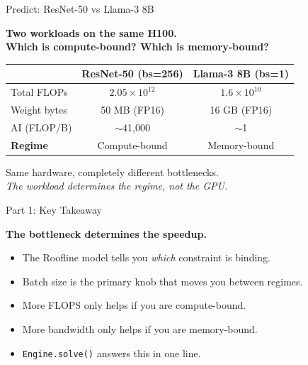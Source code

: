 \documentclass[aspectratio=169, 12pt]{beamer}
\begin{document}
\begin{frame}{Predict: ResNet-50 vs Llama-3 8B}

\centering
\Large\bfseries
Two workloads on the same H100.\\[0.3cm]
\normalsize
Which is compute-bound? Which is memory-bound?\\[0.5cm]

\pause

\small
\begin{tabular}{lcc}
\toprule
              & \textbf{ResNet-50 (bs=256)} & \textbf{Llama-3 8B (bs=1)} \\
\midrule
Total FLOPs   & $2.05 \times 10^{12}$       & $1.6 \times 10^{10}$ \\
Weight bytes   & 50 MB (FP16)               & 16 GB (FP16) \\
AI (FLOP/B)   & $\sim$41{,}000              & $\sim$1 \\
\midrule
\textbf{Regime} & \colorbox{computeblue}{Compute-bound} & \colorbox{datagreen}{Memory-bound} \\
\bottomrule
\end{tabular}

\vspace{0.3cm}
\pause
\alert{Same hardware, completely different bottlenecks.}\\
\textit{The workload determines the regime, not the GPU.}
\end{frame}

\begin{frame}{Part 1: Key Takeaway}

\centering\Large

\textbf{The bottleneck determines the speedup.}\\[0.5cm]

\normalsize
\begin{itemize}
  \item The Roofline model tells you \textit{which} constraint is binding.
  \item Batch size is the primary knob that moves you between regimes.
  \item More FLOPS only helps if you are compute-bound.
  \item More bandwidth only helps if you are memory-bound.
  \item \texttt{Engine.solve()} answers this in one line.
\end{itemize}
\end{frame}
\end{document}
